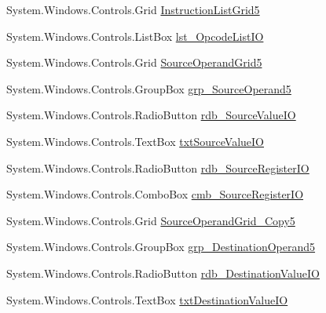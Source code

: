 \begin{DoxyCompactItemize}
\item 
System.\+Windows.\+Controls.\+Grid \hyperlink{class_c_p_u___o_s___simulator_1_1_instructions_window_a335e8ec02a78ffc483900745de96b602}{Instruction\+List\+Grid5}
\item 
System.\+Windows.\+Controls.\+List\+Box \hyperlink{class_c_p_u___o_s___simulator_1_1_instructions_window_aa8ccd453237503f0e15aff22975cea68}{lst\+\_\+\+Opcode\+List\+I\+O}
\item 
System.\+Windows.\+Controls.\+Grid \hyperlink{class_c_p_u___o_s___simulator_1_1_instructions_window_a3066f4664c81bacc6decdf84d08e74a9}{Source\+Operand\+Grid5}
\item 
System.\+Windows.\+Controls.\+Group\+Box \hyperlink{class_c_p_u___o_s___simulator_1_1_instructions_window_ab16ea5f8e2e761d0a7a0fe7054dfa3b5}{grp\+\_\+\+Source\+Operand5}
\item 
System.\+Windows.\+Controls.\+Radio\+Button \hyperlink{class_c_p_u___o_s___simulator_1_1_instructions_window_ad7bb114a6f948e79e55a44943ecf660a}{rdb\+\_\+\+Source\+Value\+I\+O}
\item 
System.\+Windows.\+Controls.\+Text\+Box \hyperlink{class_c_p_u___o_s___simulator_1_1_instructions_window_a14161b7bebd71e7545b59f77f6254a26}{txt\+Source\+Value\+I\+O}
\item 
System.\+Windows.\+Controls.\+Radio\+Button \hyperlink{class_c_p_u___o_s___simulator_1_1_instructions_window_a30064f400e25a6b155a34108a3fba816}{rdb\+\_\+\+Source\+Register\+I\+O}
\item 
System.\+Windows.\+Controls.\+Combo\+Box \hyperlink{class_c_p_u___o_s___simulator_1_1_instructions_window_a9f9d831a77d174675da89b1fe03602ad}{cmb\+\_\+\+Source\+Register\+I\+O}
\item 
System.\+Windows.\+Controls.\+Grid \hyperlink{class_c_p_u___o_s___simulator_1_1_instructions_window_a5a43b8933f014dffe28d3aa610518a94}{Source\+Operand\+Grid\+\_\+\+Copy5}
\item 
System.\+Windows.\+Controls.\+Group\+Box \hyperlink{class_c_p_u___o_s___simulator_1_1_instructions_window_aa99ecad0d35bc5e70a8924c9b3913106}{grp\+\_\+\+Destination\+Operand5}
\item 
System.\+Windows.\+Controls.\+Radio\+Button \hyperlink{class_c_p_u___o_s___simulator_1_1_instructions_window_a012739d419d605946f5dc0fd645db182}{rdb\+\_\+\+Destination\+Value\+I\+O}
\item 
System.\+Windows.\+Controls.\+Text\+Box \hyperlink{class_c_p_u___o_s___simulator_1_1_instructions_window_afd9084fd83f0c60a4fa1bba1cbcaf5af}{txt\+Destination\+Value\+I\+O}

\end{DoxyCompactItemize}
